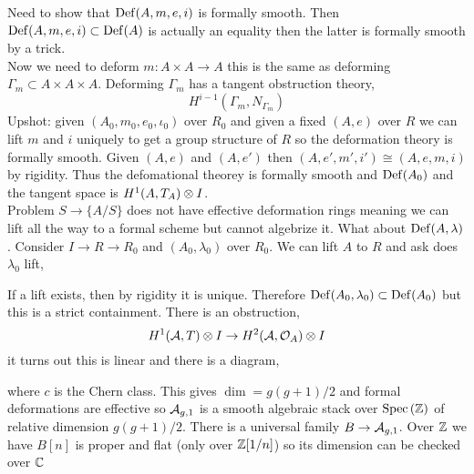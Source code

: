 \documentclass[12pt]{article}
\begin{document}
Need to show that $\mathrm{Def}(A,m,e,i)$ is formally smooth. Then $\mathrm{Def}(A,m,e,i) \subset \mathrm{Def}(A)$ is actually an equality then the latter is formally smooth by a trick. 
\bigskip\\
Now we need to deform $m : A \times A \to A$ this is the same as deforming $\Gamma_m \subset A \times A \times A$. Deforming $\Gamma_m$ has a tangent obstruction theory,
\[ H^{i-1}(\Gamma_m, N_{\Gamma_m}) \]
Upshot: given $(A_0, m_0, e_0, \iota_0)$ over $R_0$ and given a fixed $(A, e)$ over $R$ we can lift $m$ and $i$ uniquely to get a group structure of $R$ so the deformation theory is formally smooth. Given $(A, e)$ and $(A, e')$ then $(A, e',m', i') \cong (A, e, m, i)$ by rigidity. Thus the defomational theorey is formally smooth and $\mathrm{Def}(A_0)$ and the tangent space is $H^1(A, T_A) \otimes I$.
\bigskip\\
Problem $S \to \{ A / S \}$ does not have effective deformation rings meaning we can lift all the way to a formal scheme but cannot algebrize it. What about $\mathrm{Def}(A, \lambda)$. Consider $I \to R \to R_0$ and $(A_0, \lambda_0)$ over $R_0$. We can lift $A$ to $R$ and ask does $\lambda_0$ lift,
\begin{center}
\end{center}
If a lift exists, then by rigidity it is unique. Therefore $\mathrm{Def}(A_0, \lambda_0) \subset \mathrm{Def}(A_0)$ but this is a strict containment. There is an obstruction,
\[ H^1(\mathcal{A}, T) \otimes I \to H^2(\mathcal{A}, \mathcal{O}_{A}) \otimes I \]
it turns out this is linear and there is a diagram,
\begin{center}
\end{center}
where $c$ is the Chern class. This gives $\dim = g(g+1)/2$ and formal deformations are effective so $\mathcal{A}_{g,1}$ is a smooth algebraic stack over $\mathrm{Spec}\left( \mathbb{Z} \right)$ of relative dimension $g(g+1)/2$. There is a universal family $B \to \mathcal{A}_{g,1}$. Over $\mathbb{Z}$ we have $B[n]$ is proper and flat (only \etale over $\mathbb{Z}[1/n]$) so its dimension can be checked over $\mathbb{C}$ 
\end{document}
